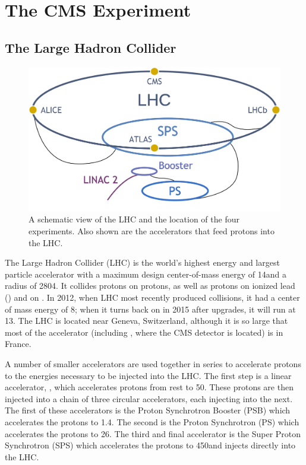 \chapter{The CMS Experiment}
\label{chapter:experiment}

\section{The Large Hadron Collider}
\label{sec:lhc}

\begin{figure}[!htbp]
    \centering
    \includegraphics[width=\textwidth]{figures/alex_lhc_layout.pdf}
    \caption[
        A schematic view of the LHC and the location of the four experiments.
    ]{
        A schematic view of the LHC and the location of the four experiments.
        Also shown are the accelerators that feed protons into the LHC.
    }
    \label{fig:lhc_layout}
\end{figure}

The Large Hadron Collider (LHC) is the world's highest energy and largest
particle accelerator with a maximum design center-of-mass energy of 14\TeV and
a radius of 2804\meters \cite{bruning2004}. It collides protons on protons, as
well as protons on ionized lead (\lead) and \lead on \lead. In 2012, when LHC
most recently produced collisions, it had a center of mass energy of 8\TeV;
when it turns back on in 2015 after upgrades, it will run at 13\TeV. The LHC is
located near Geneva, Switzerland, although it is so large that most of the
accelerator (including \pointfive, where the CMS detector is located) is in
France.

A number of smaller accelerators are used together in series to accelerate
protons to the energies necessary to be injected into the LHC. The first step
is a linear accelerator, \linactwo, which accelerates protons from rest to
50\MeV. These protons are then injected into a chain of three circular
accelerators, each injecting into the next. The first of these accelerators is
the Proton Synchrotron Booster (PSB) which accelerates the protons to 1.4\GeV.
The second is the Proton Synchrotron (PS) which accelerates the protons to
26\GeV. The third and final accelerator is the Super Proton Synchrotron (SPS)
which accelerates the protons to 450\GeV and injects directly into the LHC.

